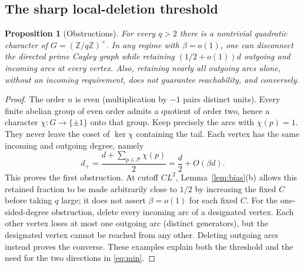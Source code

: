 \documentclass[11pt]{article}
\newtheorem{proposition}[theorem]{Proposition}
\theoremstyle{remark}\newtheorem{remark}[theorem]{Remark}
\newcommand{\Pp}{\mathcal P}
\newcommand{\Z}{\mathbb Z}
\begin{document}
\subsection{The sharp local-deletion threshold}
\begin{proposition}[Obstructions]\label{prop:sharp}
For every $q>2$ there is a nontrivial quadratic character of $G=(\Z/q\Z)^\times$. In any regime with $\beta=o(1)$, one can disconnect the directed prime Cayley graph while retaining $(1/2+o(1))d$ outgoing and incoming arcs at every vertex. Also, retaining nearly all outgoing arcs alone, without an incoming requirement, does not guarantee reachability, and conversely.
\end{proposition}
\begin{proof}
The order $n$ is even (multiplication by $-1$ pairs distinct units). Every finite abelian group of even order admits a quotient of order two, hence a character $\chi:G\to\{\pm1\}$ onto that group. Keep precisely the arcs with $\chi(p)=1$. They never leave the coset of $\ker\chi$ containing the tail. Each vertex has the same incoming and outgoing degree, namely
\[
 d_+=\frac{d+\sum_{p\in\Pp}\chi(p)}2=\frac d2+O(\beta d).
\]
This proves the first obstruction. At cutoff $CL^2$, Lemma~\ref{lem:bias}(b) allows this retained fraction to be made arbitrarily close to $1/2$ by increasing the fixed $C$ before taking $q$ large; it does not assert $\beta=o(1)$ for each fixed $C$. For the one-sided-degree obstruction, delete every incoming arc of a designated vertex. Each other vertex loses at most one outgoing arc (distinct generators), but the designated vertex cannot be reached from any other. Deleting outgoing arcs instead proves the converse. These examples explain both the threshold and the need for the two directions in \eqref{eq:min}.
\end{proof}
\end{document}
